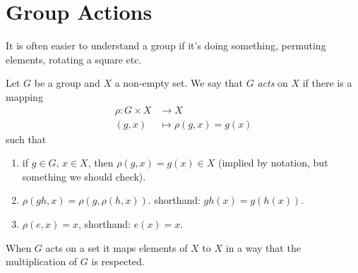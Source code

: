 \section{Group Actions}
It is often easier to understand a group if it's doing something, permuting elements, rotating a square etc.

\begin{definition}
    Let $G$ be a group and $X$ a non-empty set.
    We say that $G$ \emph{acts} on $X$ if there is a mapping
    \begin{align*}
        \rho : G \times X &\to X \\
        (g, x) &\mapsto \rho(g, x) = g(x)
    \end{align*} 
    such that 
    \begin{enumerate} \addtocounter{enumi}{-1}
        \item if $g \in G$, $x \in X$, then $\rho(g, x) = g(x) \in X$ (implied by notation, but something we should check).
        \item $\rho(gh, x) = \rho(g, \rho(h, x))$. shorthand: $gh(x) = g(h(x))$. \label{action-1}
        \item $\rho(e, x) = x$, shorthand: $e(x) = x$.
    \end{enumerate} 
    When $G$ acts on a set it maps elements of $X$ to $X$ in a way that the multiplication of $G$ is respected.
\end{definition} 

